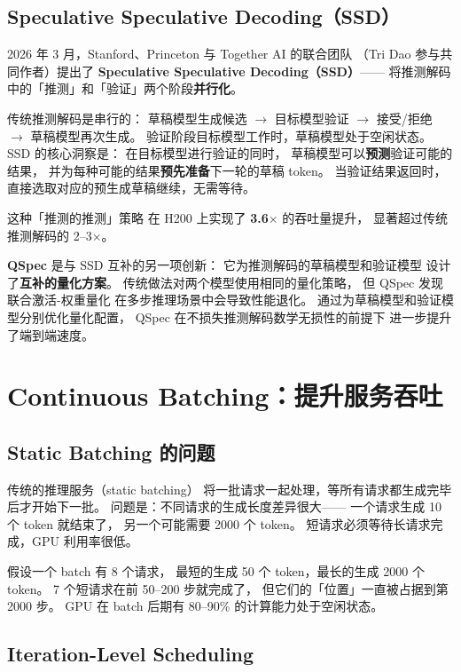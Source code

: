 \subsection{Speculative Speculative Decoding（SSD）}

2026 年 3 月，Stanford、Princeton 与 Together AI 的联合团队
（Tri Dao 参与共同作者）提出了
\textbf{Speculative Speculative Decoding（SSD）}——
将推测解码中的「推测」和「验证」两个阶段\textbf{并行化}。

传统推测解码是串行的：
草稿模型生成候选 $\to$ 目标模型验证 $\to$
接受/拒绝 $\to$ 草稿模型再次生成。
验证阶段目标模型工作时，草稿模型处于空闲状态。
SSD 的核心洞察是：
在目标模型进行验证的同时，
草稿模型可以\textbf{预测}验证可能的结果，
并为每种可能的结果\textbf{预先准备}下一轮的草稿 token。
当验证结果返回时，
直接选取对应的预生成草稿继续，无需等待。

这种「推测的推测」策略
在 H200 上实现了 \textbf{3.6$\times$} 的吞吐量提升，
显著超过传统推测解码的 2--3$\times$。

\textbf{QSpec} 是与 SSD 互补的另一项创新：
它为推测解码的草稿模型和验证模型
设计了\textbf{互补的量化方案}。
传统做法对两个模型使用相同的量化策略，
但 QSpec 发现联合激活-权重量化
在多步推理场景中会导致性能退化。
通过为草稿模型和验证模型分别优化量化配置，
QSpec 在不损失推测解码数学无损性的前提下
进一步提升了端到端速度。


\section{Continuous Batching：提升服务吞吐}

\subsection{Static Batching 的问题}

传统的推理服务（static batching）
将一批请求一起处理，等所有请求都生成完毕后才开始下一批。
问题是：不同请求的生成长度差异很大——
一个请求生成 10 个 token 就结束了，
另一个可能需要 2000 个 token。
短请求必须等待长请求完成，GPU 利用率很低。

假设一个 batch 有 8 个请求，
最短的生成 50 个 token，最长的生成 2000 个 token。
7 个短请求在前 50--200 步就完成了，
但它们的「位置」一直被占据到第 2000 步。
GPU 在 batch 后期有 80--90\% 的计算能力处于空闲状态。

\subsection{Iteration-Level Scheduling}


